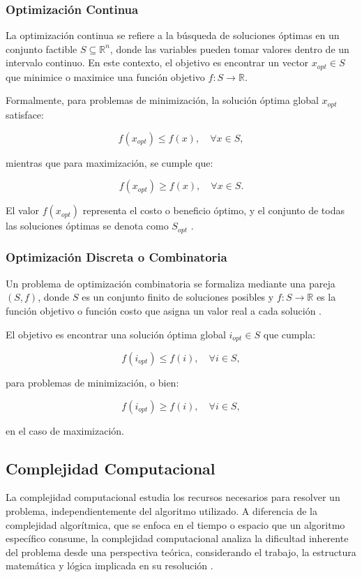 \documentclass[12pt,titlepage,twoside,openright]{book}
\begin{document}
\subsubsection{Optimización Continua}

La optimización continua se refiere a la búsqueda de soluciones óptimas en un conjunto factible \( S \subseteq \mathbb{R}^n \), donde las variables pueden tomar valores dentro de un intervalo continuo. En este contexto, el objetivo es encontrar un vector \( x_{opt} \in S \) que minimice o maximice una función objetivo \( f: S \to \mathbb{R} \).

Formalmente, para problemas de minimización, la solución óptima global \( x_{opt} \) satisface:

\[
	f(x_{opt}) \leq f(x), \quad \forall x \in S,
\]

mientras que para maximización, se cumple que:

\[
	f(x_{opt}) \geq f(x), \quad \forall x \in S.
\]

El valor \( f(x_{opt}) \) representa el costo o beneficio óptimo, y el conjunto de todas las soluciones óptimas se denota como \( S_{opt} \) \citep{cobos2010}.

\subsubsection{Optimización Discreta o Combinatoria}

Un problema de optimización combinatoria se formaliza mediante una pareja \((S, f)\), donde \(S\) es un conjunto finito de soluciones posibles y \(f: S \to \mathbb{R}\) es la función objetivo o función costo que asigna un valor real a cada solución \citep{cobos2010}.

El objetivo es encontrar una solución óptima global \(i_{opt} \in S\) que cumpla:

\[
	f(i_{opt}) \leq f(i), \quad \forall i \in S,
\]

para problemas de minimización, o bien:

\[
	f(i_{opt}) \geq f(i), \quad \forall i \in S,
\]

en el caso de maximización.
\subsection{Complejidad Computacional}

La complejidad computacional estudia los recursos necesarios para resolver un problema, independientemente del algoritmo utilizado. A diferencia de la complejidad algorítmica, que se enfoca en el tiempo o espacio que un algoritmo específico consume, la complejidad computacional analiza la dificultad inherente del problema desde una perspectiva teórica, considerando el trabajo, la estructura matemática y lógica implicada en su resolución \citep{maldonado2013problema}.
\end{document}
